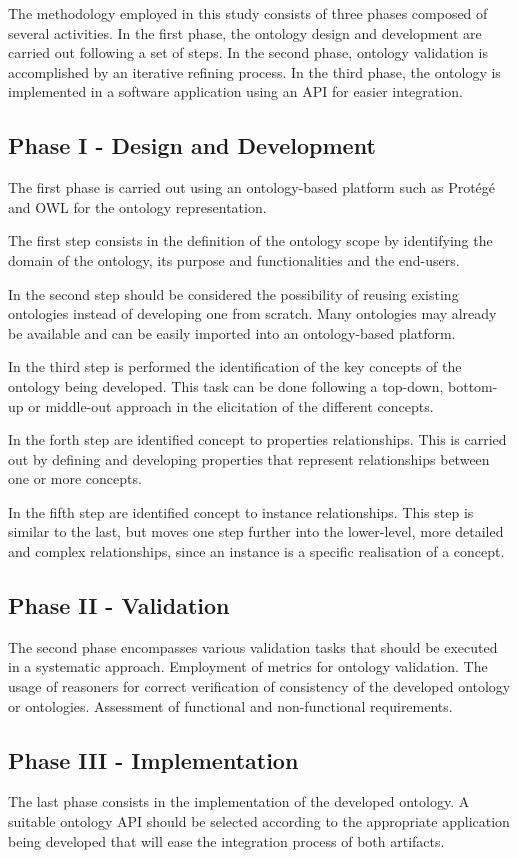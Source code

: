 The methodology employed in this study consists of three phases composed of several activities.
In the first phase, the ontology design and development are carried out following a set of steps.
In the second phase, ontology validation is accomplished by an iterative refining process.
In the third phase, the ontology is implemented in a software application using an API for easier integration.

\subsection{Phase I - Design and Development} \label{phasesChapter}

The first phase is carried out using an ontology-based platform such as Protégé and OWL for the ontology representation.

The first step consists in the definition of the ontology scope by identifying the domain of the ontology, its purpose and functionalities and the end-users.

In the second step should be considered the possibility of reusing existing ontologies instead of developing one from scratch.
Many ontologies may already be available and can be easily imported into an ontology-based platform.

In the third step is performed the identification of the key concepts of the ontology being developed.
This task can be done following a top-down, bottom-up or middle-out approach in the elicitation of the different concepts.

In the forth step are identified concept to properties relationships.
This is carried out by defining and developing properties that represent relationships between one or more concepts.

In the fifth step are identified concept to instance relationships.
This step is similar to the last, but moves one step further into the lower-level, more detailed and complex relationships, since an instance is a specific realisation of a concept.

\subsection{Phase II - Validation}
 
The second phase encompasses various validation tasks that should be executed in a systematic approach.
Employment of metrics for ontology validation.
The usage of reasoners for correct verification of consistency of the developed ontology or ontologies.
Assessment of functional and non-functional requirements.

\subsection{Phase III - Implementation}

The last phase consists in the implementation of the developed ontology.
A suitable ontology API should be selected according to the appropriate application being developed that will ease the integration process of both artifacts.


